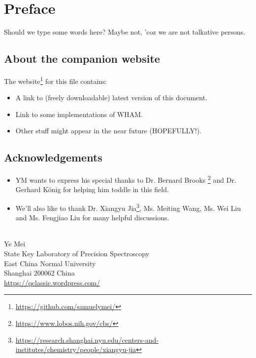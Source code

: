 \chapter*{Preface}
Should we type some words here? Maybe not, 'coz we are not talkative persons.

\section*{About the companion website}
The website\footnote{\url{https://github.com/samuelymei/}} for this file contains:
\begin{itemize}
  \item A link to (freely downloadable) latest version of this document.
  \item Link to some implementations of WHAM.
  \item Other stuff might appear in the near future (HOPEFULLY!).
\end{itemize}

\section*{Acknowledgements}
\begin{itemize}
\item YM wants to express his special thanks to Dr. Bernard Brooks \footnote{\url{https://www.lobos.nih.gov/cbs/}} and Dr. Gerhard K\"onig for helping him toddle in this field.
\item We'll also like to thank Dr. Xiangyu Jia\footnote{\url{https://research.shanghai.nyu.edu/centers-and-institutes/chemistry/people/xiangyu-jia}}, Ms. Meiting Wang, Ms. Wei Liu and Ms. Fengjiao Liu for many helpful discussions.
\end{itemize}
\mbox{}\\
\noindent Ye Mei \\
\noindent State Key Laboratory of Precision Spectroscopy\\
\noindent East China Normal University\\
\noindent Shanghai 200062 China\\
\noindent \url{https://qclassic.wordpress.com/}